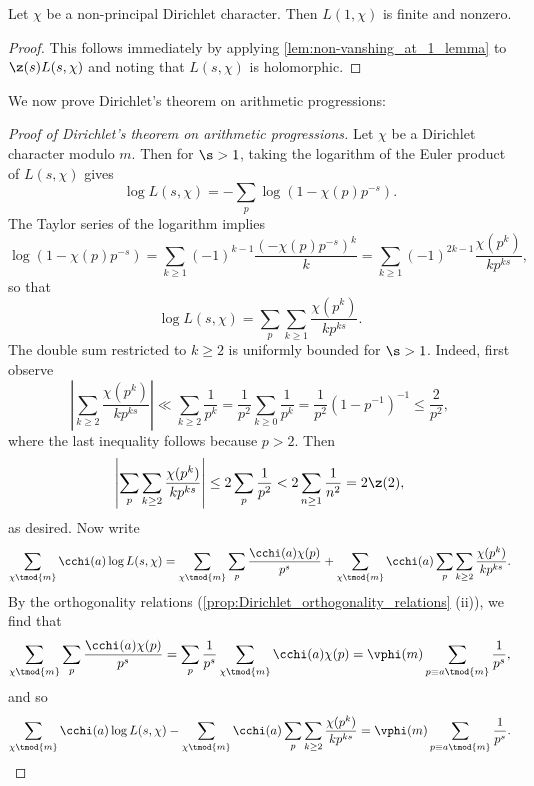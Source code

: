     \begin{theorem}\label{thm:non-vanishing_of_Dirichlet_L-functions_at_s=1}
      Let $\chi$ be a non-principal Dirichlet character. Then $L(1,\chi)$ is finite and nonzero.
    \end{theorem}
    \begin{proof}
      This follows immediately by applying \cref{lem:non-vanshing_at_1_lemma} to $\z(s)L(s,\chi)$ and noting that $L(s,\chi)$ is holomorphic.
    \end{proof}

     We now prove Dirichlet's theorem on arithmetic progressions:

    \begin{proof}[Proof of Dirichlet's theorem on arithmetic progressions]
        Let $\chi$ be a Dirichlet character modulo $m$. Then for $\s > 1$, taking the logarithm of the Euler product of $L(s,\chi)$ gives
        \[
          \log{L(s,\chi)} = -\sum_{p}\log(1-\chi(p)p^{-s}).
        \]
        The Taylor series of the logarithm implies
        \[
          \log(1-\chi(p)p^{-s}) = \sum_{k \ge 1}(-1)^{k-1}\frac{(-\chi(p)p^{-s})^{k}}{k} = \sum_{k \ge 1}(-1)^{2k-1}\frac{\chi(p^{k})}{kp^{ks}},
        \]
        so that
        \[
          \log{L(s,\chi)} = \sum_{p}\sum_{k \ge 1}\frac{\chi(p^{k})}{kp^{ks}}.
        \]
        The double sum restricted to $k \ge 2$ is uniformly bounded for $\s > 1$. Indeed, first observe
        \[
          \left|\sum_{k \ge 2}\frac{\chi(p^{k})}{kp^{ks}}\right| \ll \sum_{k \ge 2}\frac{1}{p^{k}} = \frac{1}{p^{2}}\sum_{k \ge 0}\frac{1}{p^{k}} = \frac{1}{p^{2}}(1-p^{-1})^{-1} \le \frac{2}{p^{2}},
        \]
        where the last inequality follows because $p > 2$. Then
        \[
          \left|\sum_{p}\sum_{k \ge 2}\frac{\chi(p^{k})}{kp^{ks}}\right| \le 2\sum_{p}\frac{1}{p^{2}} < 2\sum_{n \ge 1}\frac{1}{n^{2}} = 2\z(2),
        \]
        as desired. Now write
        \[
          \sum_{\chi \tmod{m}}\cchi(a)\log{L(s,\chi)} = \sum_{\chi \tmod{m}}\sum_{p}\frac{\cchi(a)\chi(p)}{p^{s}}+\sum_{\chi \tmod{m}}\cchi(a)\sum_{p}\sum_{k \ge 2}\frac{\chi(p^{k})}{kp^{ks}}.
        \]
        By the orthogonality relations (\cref{prop:Dirichlet_orthogonality_relations} (ii)), we find that
        \[
          \sum_{\chi \tmod{m}}\sum_{p}\frac{\cchi(a)\chi(p)}{p^{s}} = \sum_{p}\frac1{p^{s}}\sum_{\chi \tmod{m}}\cchi(a)\chi(p) = \vphi(m)\sum_{p \equiv{a} \tmod{m}}\frac{1}{p^{s}},
        \]
        and so
        \[
          \sum_{\chi \tmod{m}}\cchi(a)\log{L(s,\chi)}-\sum_{\chi \tmod{m}}\cchi(a)\sum_{p}\sum_{k \ge 2}\frac{\chi(p^{k})}{kp^{ks}} = \vphi(m)\sum_{p \equiv{a} \tmod{m}}\frac{1}{p^{s}}.
\]
\end{proof}
